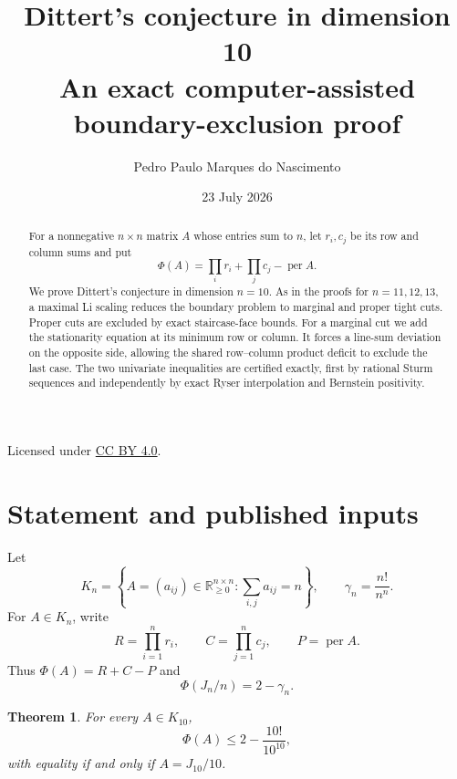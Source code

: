 \documentclass[11pt]{article}
\title{Dittert's conjecture in dimension 10\\
\large An exact computer-assisted boundary-exclusion proof}
\author{Pedro Paulo Marques do Nascimento}
\date{23 July 2026}
\newtheorem{theorem}{Theorem}[section]
\theoremstyle{remark}
\newcommand{\per}{\operatorname{per}}
\newcommand{\RR}{\mathbb R}
\begin{document}
\maketitle

\begin{center}

\small Licensed under \href{https://creativecommons.org/licenses/by/4.0/}{CC BY 4.0}.
\end{center}

\begin{abstract}
For a nonnegative $n\times n$ matrix $A$ whose entries sum to $n$, let $r_i,c_j$
be its row and column sums and put
\[
 \Phi(A)=\prod_i r_i+\prod_j c_j-\per A.
\]
We prove Dittert's conjecture in dimension $n=10$.  As in the proofs for
$n=11,12,13$, a maximal Li scaling reduces the boundary problem to marginal
and proper tight cuts.  Proper cuts are excluded by exact staircase-face
bounds.  For a marginal cut we add the stationarity equation at its minimum
row or column.  It forces a line-sum deviation on the opposite side, allowing
the shared row--column product deficit to exclude the last case.  The two
univariate inequalities are certified exactly, first by rational Sturm
sequences and independently by exact Ryser interpolation and Bernstein
positivity.
\end{abstract}

\section{Statement and published inputs}

Let
\[
 K_n=\left\{A=(a_{ij})\in\RR_{\ge0}^{n\times n}:
       \sum_{i,j}a_{ij}=n\right\},
 \qquad
 \gamma_n=\frac{n!}{n^n}.
\]
For $A\in K_n$, write
\[
 R=\prod_{i=1}^n r_i,\qquad
 C=\prod_{j=1}^n c_j,\qquad
 P=\per A.
\]
Thus $\Phi(A)=R+C-P$ and
\[
 \Phi(J_n/n)=2-\gamma_n.
\]

\begin{theorem}\label{thm:main}
For every $A\in K_{10}$,
\[
 \Phi(A)\le 2-\frac{10!}{10^{10}},
\]
with equality if and only if $A=J_{10}/10$.
\end{theorem}
\end{document}
